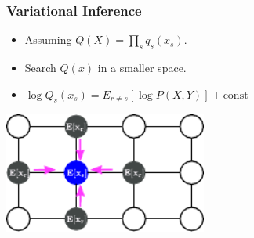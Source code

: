 \documentclass[sansserif, 10pt]{beamer}
\begin{document}
\begin{frame}
  \frametitle{Variational Inference}
  \begin{block}{}
    \begin{itemize}
    \item Assuming $Q(X) = \prod_s q_s(x_s)$.
    \item Search $Q(x)$ in a smaller space.
    \item $\log Q_s(x_s) = E_{r\neq s} [ \log P(X, Y)] + \textrm{const}$
    \end{itemize}
  \end{block}
  \vspace{10pt}
  \centering
  \includegraphics[width=0.5\textwidth]{sfig/variational_inf}
\end{frame}

\end{document}
